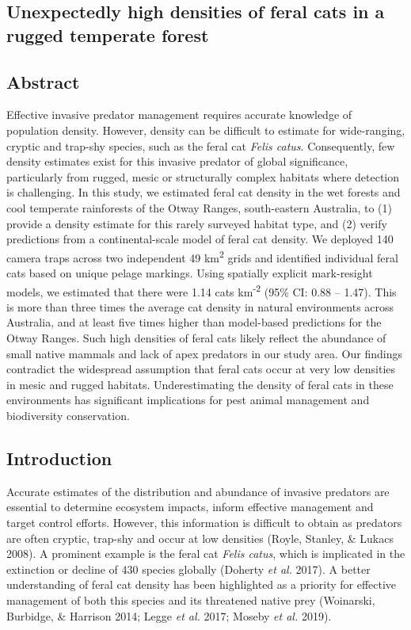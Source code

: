 \documentclass[11pt,a4paper,titlepage,twoside,openright]{style/unimelbthesis}
\begin{document}
\begin{mainmatter}
{\chapter{Unexpectedly high densities of feral cats in a rugged temperate forest}\label{otways17}}

\hypertarget{abstract}{%
\section*{Abstract}\label{abstract}}

Effective invasive predator management requires accurate knowledge of population density. However, density can be difficult to estimate for wide-ranging, cryptic and trap-shy species, such as the feral cat \emph{Felis catus}. Consequently, few density estimates exist for this invasive predator of global significance, particularly from rugged, mesic or structurally complex habitats where detection is challenging. In this study, we estimated feral cat density in the wet forests and cool temperate rainforests of the Otway Ranges, south-eastern Australia, to (1) provide a density estimate for this rarely surveyed habitat type, and (2) verify predictions from a continental-scale model of feral cat density. We deployed 140 camera traps across two independent 49 km\textsuperscript{2} grids and identified individual feral cats based on unique pelage markings. Using spatially explicit mark-resight models, we estimated that there were 1.14 cats km\textsuperscript{-2} (95\% CI: 0.88 -- 1.47). This is more than three times the average cat density in natural environments across Australia, and at least five times higher than model-based predictions for the Otway Ranges. Such high densities of feral cats likely reflect the abundance of small native mammals and lack of apex predators in our study area. Our findings contradict the widespread assumption that feral cats occur at very low densities in mesic and rugged habitats. Underestimating the density of feral cats in these environments has significant implications for pest animal management and biodiversity conservation.

\newpage

\hypertarget{introduction}{%
\section{Introduction}\label{introduction}}

Accurate estimates of the distribution and abundance of invasive predators are essential to determine ecosystem impacts, inform effective management and target control efforts. However, this information is difficult to obtain as predators are often cryptic, trap-shy and occur at low densities (Royle, Stanley, \& Lukacs 2008). A prominent example is the feral cat \emph{Felis catus}, which is implicated in the extinction or decline of 430 species globally (Doherty \emph{et al.} 2017). A better understanding of feral cat density has been highlighted as a priority for effective management of both this species and its threatened native prey (Woinarski, Burbidge, \& Harrison 2014; Legge \emph{et al.} 2017; Moseby \emph{et al.} 2019).


\end{mainmatter}
\end{document}
